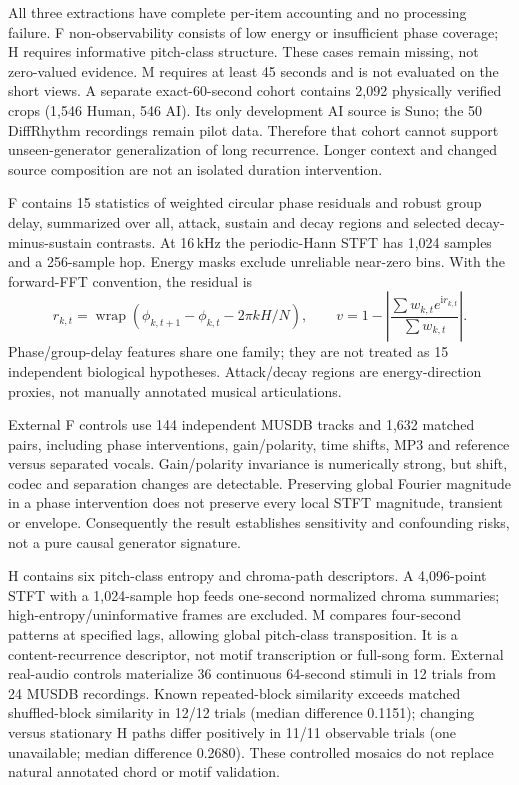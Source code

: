 All three extractions have complete per-item accounting and no processing failure.
F non-observability consists of low energy or insufficient phase coverage; H
requires informative pitch-class structure. These cases remain missing, not
zero-valued evidence. M requires at least 45 seconds and is not evaluated on
the short views. A separate exact-60-second cohort contains 2,092 physically
verified crops (1,546 Human, 546 AI). Its only development AI source is Suno;
the 50 DiffRhythm recordings remain pilot data. Therefore that cohort cannot
support unseen-generator generalization of long recurrence. Longer context and
changed source composition are not an isolated duration intervention.

F contains 15 statistics of weighted circular phase residuals and robust group
delay, summarized over all, attack, sustain and decay regions and selected
decay-minus-sustain contrasts. At 16\,kHz the periodic-Hann STFT has 1,024 samples
and a 256-sample hop. Energy masks exclude unreliable near-zero bins. With the
forward-FFT convention, the residual is
\begin{equation}
 r_{k,t}=\operatorname{wrap}\left(\phi_{k,t+1}-\phi_{k,t}
                 -2\pi kH/N\right),\qquad
 v=1-\left|\frac{\sum w_{k,t}e^{\mathrm{i}r_{k,t}}}{\sum w_{k,t}}\right|.
\end{equation}
Phase/group-delay features share one family; they are not treated as 15
independent biological hypotheses. Attack/decay regions are energy-direction
proxies, not manually annotated musical articulations.

External F controls use 144 independent MUSDB tracks and 1,632 matched pairs,
including phase interventions, gain/polarity, time shifts, MP3 and reference
versus separated vocals. Gain/polarity invariance is numerically strong, but
shift, codec and separation changes are detectable. Preserving global Fourier
magnitude in a phase intervention does not preserve every local STFT magnitude,
transient or envelope. Consequently the result establishes sensitivity and
confounding risks, not a pure causal generator signature.

H contains six pitch-class entropy and chroma-path descriptors. A 4,096-point
STFT with a 1,024-sample hop feeds one-second normalized chroma summaries;
high-entropy/uninformative frames are excluded. M compares four-second patterns
at specified lags, allowing global pitch-class transposition. It is a
content-recurrence descriptor, not motif transcription or full-song form.
External real-audio controls materialize 36 continuous 64-second stimuli in
12 trials from 24 MUSDB recordings. Known repeated-block similarity exceeds
matched shuffled-block similarity in 12/12 trials (median difference 0.1151);
changing versus stationary H paths differ positively in 11/11 observable trials
(one unavailable; median difference 0.2680). These controlled mosaics do not
replace natural annotated chord or motif validation.

